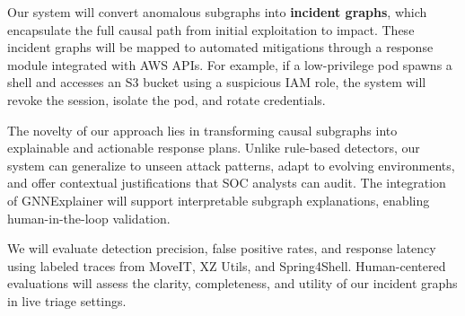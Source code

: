 Our system will convert anomalous subgraphs into \textbf{incident graphs}, which encapsulate the full causal path from initial exploitation to impact. These incident graphs will be mapped to automated mitigations through a response module integrated with AWS APIs. For example, if a low-privilege pod spawns a shell and accesses an S3 bucket using a suspicious IAM role, the system will revoke the session, isolate the pod, and rotate credentials.

The novelty of our approach lies in transforming causal subgraphs into explainable and actionable response plans. Unlike rule-based detectors, our system can generalize to unseen attack patterns, adapt to evolving environments, and offer contextual justifications that SOC analysts can audit. The integration of GNNExplainer will support interpretable subgraph explanations, enabling human-in-the-loop validation.

We will evaluate detection precision, false positive rates, and response latency using labeled traces from MoveIT, XZ Utils, and Spring4Shell. Human-centered evaluations will assess the clarity, completeness, and utility of our incident graphs in live triage settings.






